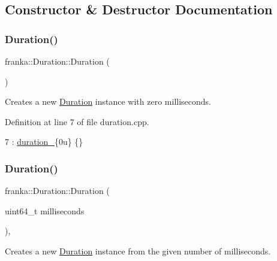 \subsection{Constructor \& Destructor Documentation}
\mbox{\label{classfranka_1_1Duration_af721da321423772b4ce7ff11280d38d5}} 
\subsubsection{\texorpdfstring{Duration()}{Duration()}\hspace{0.1cm}{\footnotesize\ttfamily [1/4]}}
{\footnotesize\ttfamily franka\+::\+Duration\+::\+Duration (\begin{DoxyParamCaption}{ }\end{DoxyParamCaption})\hspace{0.3cm}{\ttfamily [noexcept]}}

Creates a new \hyperlink{classfranka_1_1Duration}{Duration} instance with zero milliseconds. 

Definition at line 7 of file duration.\+cpp.


\begin{DoxyCode}
7 : \hyperlink{classfranka_1_1Duration_ae446c403b200f0dbf92fb51ca21e82ff}{duration\_}\{0u\} \{\}
\end{DoxyCode}
\mbox{\label{classfranka_1_1Duration_a46f0cea3e05c27cdaaba5ff25e0e6cd6}} 
\subsubsection{\texorpdfstring{Duration()}{Duration()}\hspace{0.1cm}{\footnotesize\ttfamily [2/4]}}
{\footnotesize\ttfamily franka\+::\+Duration\+::\+Duration (\begin{DoxyParamCaption}\item[{uint64\+\_\+t}]{milliseconds }\end{DoxyParamCaption})\hspace{0.3cm}{\ttfamily [explicit]}, {\ttfamily [noexcept]}}

Creates a new \hyperlink{classfranka_1_1Duration}{Duration} instance from the given number of milliseconds.


